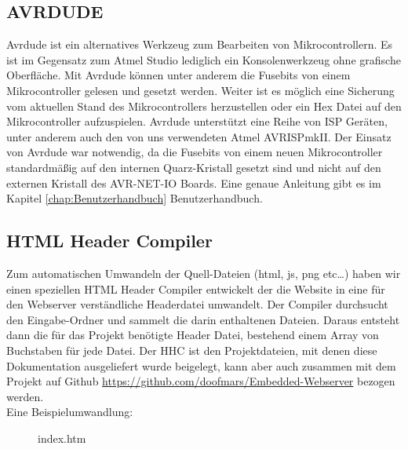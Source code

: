 
\subsection{AVRDUDE}

Avrdude ist ein alternatives Werkzeug zum Bearbeiten von Mikrocontrollern. Es
ist im Gegensatz zum Atmel Studio lediglich ein Konsolenwerkzeug ohne
grafische Oberfläche. Mit Avrdude können unter anderem die Fusebits von einem
Mikrocontroller gelesen und gesetzt werden. Weiter ist es möglich eine Sicherung
vom aktuellen Stand des Mikrocontrollers herzustellen oder ein Hex Datei auf
den Mikrocontroller aufzuspielen. Avrdude unterstützt eine Reihe von \ac{ISP}
Geräten, unter anderem auch den von uns verwendeten Atmel AVRISPmkII. Der Einsatz von
Avrdude war notwendig, da die Fusebits von einem neuen Mikrocontroller
standardmäßig auf den internen Quarz-Kristall gesetzt sind und nicht auf den
externen Kristall des AVR-NET-IO Boards.
Eine genaue Anleitung gibt es im Kapitel \ref{chap:Benutzerhandbuch}
Benutzerhandbuch.

\newpage

\subsection{HTML Header Compiler}
\label{chap:hintergrund.HHC}

Zum automatischen Umwandeln der Quell-Dateien (html, js, png etc\ldots) haben
wir einen speziellen HTML Header Compiler entwickelt der die Website in eine
für den Webserver verständliche Headerdatei umwandelt. Der Compiler durchsucht
den Eingabe-Ordner und sammelt die darin enthaltenen Dateien. Daraus entsteht
dann die für das Projekt benötigte Header Datei, bestehend einem Array von
Buchstaben für jede Datei. Der \ac{HHC} ist den Projektdateien, mit denen diese
Dokumentation ausgeliefert wurde beigelegt, kann aber auch zusammen mit dem
Projekt auf Github \url{https://github.com/doofmars/Embedded-Webserver}
bezogen werden.\\

Eine Beispielumwandlung: 

\begin{figure}[H]

\caption{index.htm}
\label{HHC.input}
\end{figure}

